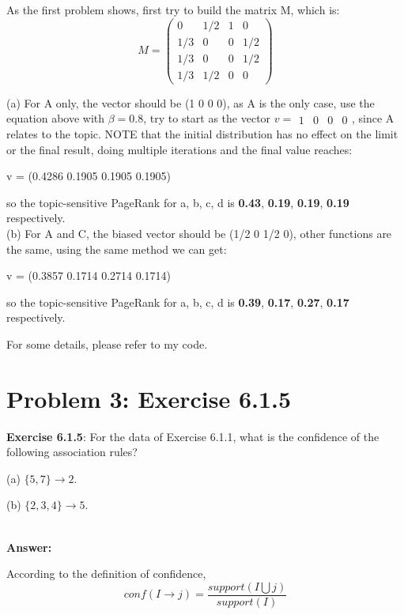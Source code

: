 \documentclass{article}
\begin{document}
As the first problem shows, first try to build the matrix M, which is:
$$M = \begin{pmatrix} 0 & 1/2 & 1 & 0 \\ 1/3 & 0 & 0 & 1/2 \\ 1/3 & 0 & 0 & 1/2 \\ 1/3 & 1/2 & 0 & 0\end{pmatrix}$$

(a) For A only, the vector should be (1 0 0 0), as A is the only case, use the equation above with $\beta{}=0.8$, try to start as the vector $v=\begin{matrix} 1 & 0 & 0 & 0\end{matrix}$, since A relates to the topic. NOTE that the initial distribution has no effect on the limit or the final result, doing multiple iterations and the final value reaches:


\begin{center}
v = (0.4286 0.1905 0.1905 0.1905)
\end{center}

so the topic-sensitive PageRank for a, b, c, d is \textbf{0.43}, \textbf{0.19}, \textbf{0.19}, \textbf{0.19} respectively.
~\\

(b) For A and C, the biased vector should be (1/2 0 1/2 0), other functions are the same, using the same method we can get:

\begin{center}
v = (0.3857  0.1714  0.2714 0.1714)
\end{center}

so the topic-sensitive PageRank for a, b, c, d is \textbf{0.39}, \textbf{0.17}, \textbf{0.27}, \textbf{0.17} respectively.

For some details, please refer to my code.


\section{Problem 3: Exercise 6.1.5}

\textbf{Exercise 6.1.5}: For the data of Exercise 6.1.1, what is the confidence of the
following association rules?

(a) $\{5, 7\} \rightarrow  2$.

(b) $\{2, 3, 4\} \rightarrow 5$.

~\\
\textbf{Answer:}

According to the definition of confidence, $$conf(I \rightarrow j) = \frac{support(I \bigcup j)}{support(I)}$$
\end{document}
